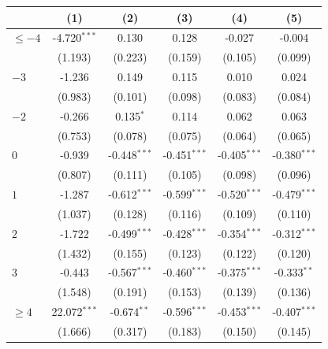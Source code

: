 
\begingroup
\centering
\begin{tabular}{lccccc}
   \toprule
                        & (1)             & (2)            & (3)            & (4)            & (5)\\  
   \midrule 
   $\leq -4$            & -4.720$^{***}$  & 0.130          & 0.128          & -0.027         & -0.004\\   
                        & (1.193)         & (0.223)        & (0.159)        & (0.105)        & (0.099)\\   
   $-3$                 & -1.236          & 0.149          & 0.115          & 0.010          & 0.024\\   
                        & (0.983)         & (0.101)        & (0.098)        & (0.083)        & (0.084)\\   
   $-2$                 & -0.266          & 0.135$^{*}$    & 0.114          & 0.062          & 0.063\\   
                        & (0.753)         & (0.078)        & (0.075)        & (0.064)        & (0.065)\\   
   $0$                  & -0.939          & -0.448$^{***}$ & -0.451$^{***}$ & -0.405$^{***}$ & -0.380$^{***}$\\   
                        & (0.807)         & (0.111)        & (0.105)        & (0.098)        & (0.096)\\   
   $1$                  & -1.287          & -0.612$^{***}$ & -0.599$^{***}$ & -0.520$^{***}$ & -0.479$^{***}$\\   
                        & (1.037)         & (0.128)        & (0.116)        & (0.109)        & (0.110)\\   
   $2$                  & -1.722          & -0.499$^{***}$ & -0.428$^{***}$ & -0.354$^{***}$ & -0.312$^{***}$\\   
                        & (1.432)         & (0.155)        & (0.123)        & (0.122)        & (0.120)\\   
   $3$                  & -0.443          & -0.567$^{***}$ & -0.460$^{***}$ & -0.375$^{***}$ & -0.333$^{**}$\\   
                        & (1.548)         & (0.191)        & (0.153)        & (0.139)        & (0.136)\\   
   $\geq 4$             & 22.072$^{***}$  & -0.674$^{**}$  & -0.596$^{***}$ & -0.453$^{***}$ & -0.407$^{***}$\\   
                        & (1.666)         & (0.317)        & (0.183)        & (0.150)        & (0.145)\\   

\end{tabular}
